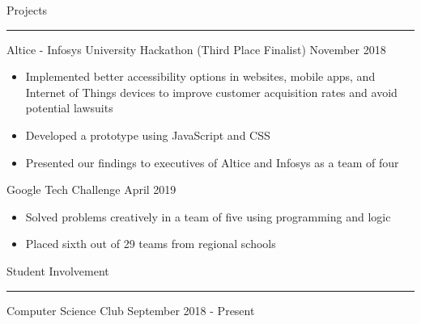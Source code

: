 \documentclass{article}
\newcommand \spacingBetweenHeadings {0.5em}
\begin{document}
\noindent
\huge Projects\par
\vspace{0.1em}
\hrule
\Large
\vspace{1em}
\noindent
Altice - Infosys University Hackathon (Third Place Finalist)
\hfill
November 2018\\
\vspace{-1em}
\begin{itemize}
\item Implemented better accessibility options in websites, mobile apps, and Internet of Things devices to improve customer acquisition rates and avoid potential lawsuits
\item Developed a prototype using JavaScript and CSS
\item Presented our findings to executives of Altice and Infosys as a team of four
\end{itemize}
Google Tech Challenge
\hfill
April 2019\\
\vspace{-1em}
\begin{itemize}
\item Solved problems creatively in a team of five using programming and logic
\item Placed sixth out of 29 teams from regional schools
\end{itemize}
\vspace{\spacingBetweenHeadings}

\noindent
\huge Student Involvement\par
\vspace{0.1em}
\hrule
\Large
\vspace{1em}
\noindent
Computer Science Club
\hfill
September 2018 - Present\\
\end{document}
